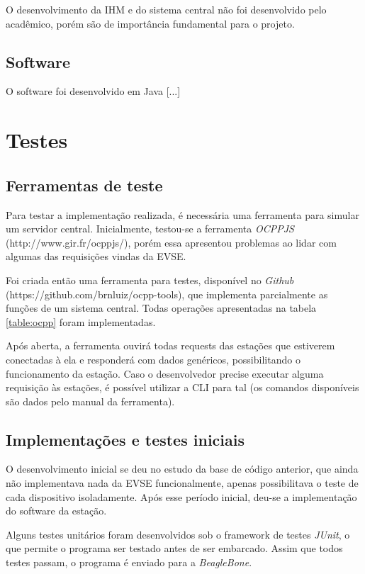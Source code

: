       O desenvolvimento da IHM e do sistema central não foi desenvolvido pelo acadêmico, porém são de importância fundamental para o projeto.

    \subsection{Software}

      O software foi desenvolvido em Java [...]

  \section{Testes}

    \subsection{Ferramentas de teste}

      Para testar a implementação realizada, é necessária uma ferramenta para simular um servidor central. Inicialmente, testou-se a ferramenta \textit{OCPPJS} (http://www.gir.fr/ocppjs/), porém essa apresentou problemas ao lidar com algumas das requisições vindas da \ac{EVSE}.

      Foi criada então uma ferramenta para testes, disponível no \textit{Github} (https://github.com/brnluiz/ocpp-tools), que implementa parcialmente as funções de um sistema central. Todas operações apresentadas na tabela \ref{table:ocpp} foram implementadas.

      Após aberta, a ferramenta ouvirá todas requests das estações que estiverem conectadas à ela e responderá com dados genéricos, possibilitando o funcionamento da estação. Caso o desenvolvedor precise executar alguma requisição às estações, é possível utilizar a \ac{CLI} para tal (os comandos disponíveis são dados pelo manual da ferramenta).

    \subsection{Implementações e testes iniciais}

      O desenvolvimento inicial se deu no estudo da base de código anterior, que ainda não implementava nada da \ac{EVSE} funcionalmente, apenas possibilitava o teste de cada dispositivo isoladamente. Após esse período inicial, deu-se a implementação do software da estação.

      Alguns testes unitários foram desenvolvidos sob o framework de testes \textit{JUnit}, o que permite o programa ser testado antes de ser embarcado. Assim que todos testes passam, o programa é enviado para a \textit{BeagleBone}.

